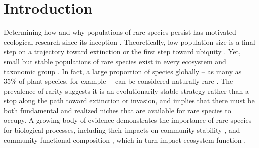 \documentclass[12pt, letterpaper]{article}
\begin{document}
\section{Introduction}
Determining how and why populations of rare species persist has motivated ecological research since its inception \cite{Levins1971RegionalSpecies, Drury1974RareSpecies}. Theoretically, low population size is a final step on a trajectory toward extinction \cite{Stanley1979Macroevolution:Process, Rosenzweig1997TheRarity} or the first step toward ubiquity \cite{Spear2021}.  Yet, small but stable populations of rare species exist in every ecosystem and taxonomic group \cite{Magurran2011CommonnessRarity}. In fact, a large proportion of species globally – as many as 35\% of plant species, for example— can be considered naturally rare \cite{Enquist2019ThePlants}. The prevalence of rarity suggests it is an evolutionarily stable strategy rather than a stop along the path toward extinction or invasion, and implies that there must be both fundamental and realized niches that are available for rare species to occupy. A growing body of evidence demonstrates the importance of rare species for biological processes, including their impacts on community stability \cite{Arnoldi2019ThePatterns, Saterberg2019ADynamics}, and community functional composition \cite{Leitao2016RareAssemblages, Burner2022FunctionalSpecies}, which in turn impact ecosystem function \cite{Lyons2005RareFunctioning}. 
\end{document}

